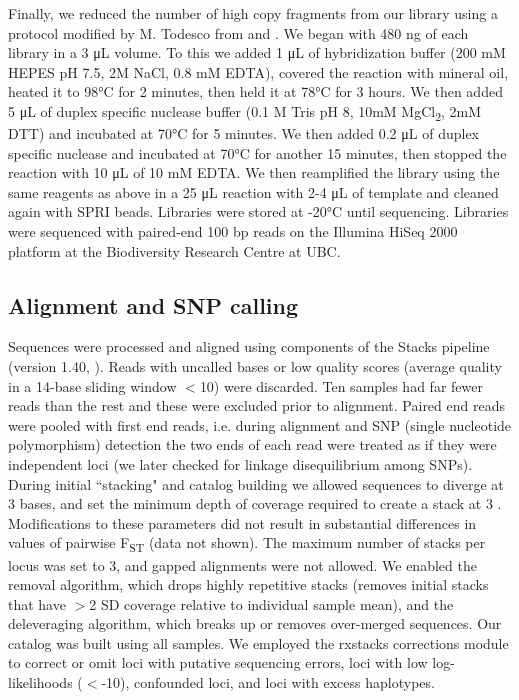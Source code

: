 \documentclass{article}
\begin{document}
Finally, we reduced the number of high copy fragments from our library using a protocol modified by M. Todesco from \cite{shagina2010normalization} and \cite{matvienko2013consequences}. We began with 480 ng of each library in a 3 \si{\micro\liter} volume. To this we added 1 \si{\micro\liter} of hybridization buffer (200 mM HEPES pH 7.5, 2M NaCl, 0.8 mM EDTA), covered the reaction with mineral oil, heated it to 98\si{\degree}C for 2 minutes, then held it at 78\si{\degree}C for 3 hours. We then added 5 \si{\micro\liter} of duplex specific nuclease buffer (0.1 M Tris pH 8, 10mM MgCl\textsubscript{2}, 2mM DTT) and incubated at 70\si{\degree}C for 5 minutes. We then added 0.2 \si{\micro\liter} of duplex specific nuclease and incubated at 70\si{\degree}C for another 15 minutes, then stopped the reaction with 10 \si{\micro\liter} of 10 mM EDTA. We then reamplified the library using the same reagents as above in a 25 \si{\micro\liter} reaction with 2-4 \si{\micro\liter} of template and cleaned again with SPRI beads. Libraries were stored at -20\si{\degree}C until sequencing. Libraries were sequenced with paired-end 100 bp reads on the Illumina HiSeq 2000 platform at the Biodiversity Research Centre at UBC.

\subsection*{Alignment and SNP calling}

Sequences were processed and aligned using components of the Stacks pipeline (version 1.40, \citealp{catchen2011stacks, catchen2013stacks}). Reads with uncalled bases or low quality scores (average quality in a 14-base sliding window $<$10) were discarded. Ten samples had far fewer reads than the rest and these were excluded prior to alignment. Paired end reads were pooled with first end reads, i.e. during alignment and SNP (single nucleotide polymorphism) detection the two ends of each read were treated as if they were independent loci (we later checked for linkage disequilibrium among SNPs). During initial ``stacking" and catalog building we allowed sequences to diverge at 3 bases, and set the minimum depth of coverage required to create a stack at 3 \citep{rochette2017deriving}. Modifications to these parameters did not result in substantial differences in values of pairwise F\textsubscript{ST} (data not shown). The maximum number of stacks per locus was set to 3, and gapped alignments were not allowed. We enabled the removal algorithm, which drops highly repetitive stacks (removes initial stacks that have $>$2 SD coverage relative to individual sample mean), and the deleveraging algorithm, which breaks up or removes over-merged sequences. Our catalog was built using all samples. We employed the rxstacks corrections module to correct or omit loci with putative sequencing errors, loci with low log-likelihoods ($<$-10), confounded loci, and loci with excess haplotypes.
\end{document}
